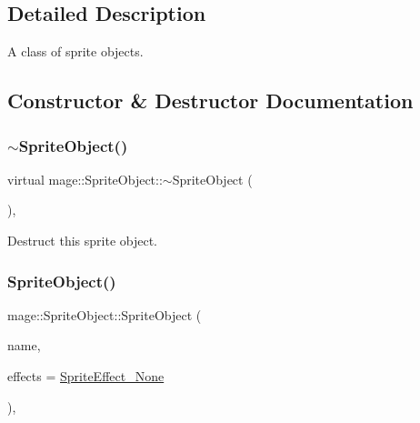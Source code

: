 \subsection{Detailed Description}
A class of sprite objects. 

\subsection{Constructor \& Destructor Documentation}
\hypertarget{classmage_1_1_sprite_object_a88c02e6af2ab79389de368dd9ba32930}{}\label{classmage_1_1_sprite_object_a88c02e6af2ab79389de368dd9ba32930} 
\subsubsection{\texorpdfstring{$\sim$\+Sprite\+Object()}{~SpriteObject()}}
{\footnotesize\ttfamily virtual mage\+::\+Sprite\+Object\+::$\sim$\+Sprite\+Object (\begin{DoxyParamCaption}{ }\end{DoxyParamCaption})\hspace{0.3cm}{\ttfamily [virtual]}, {\ttfamily [default]}}

Destruct this sprite object. \hypertarget{classmage_1_1_sprite_object_a1d487cfddfd6e3f60047f9316522ba8b}{}\label{classmage_1_1_sprite_object_a1d487cfddfd6e3f60047f9316522ba8b} 
\subsubsection{\texorpdfstring{Sprite\+Object()}{SpriteObject()}\hspace{0.1cm}{\footnotesize\ttfamily [1/3]}}
{\footnotesize\ttfamily mage\+::\+Sprite\+Object\+::\+Sprite\+Object (\begin{DoxyParamCaption}\item[{const string \&}]{name,  }\item[{\hyperlink{namespacemage_a9cfe18123066ba4236f548f9de75d881}{Sprite\+Effect}}]{effects = {\ttfamily \hyperlink{namespacemage_a9cfe18123066ba4236f548f9de75d881af3c275fbfacfe174da928b2f24dfa515}{Sprite\+Effect\+\_\+\+None}} }\end{DoxyParamCaption})\hspace{0.3cm}{\ttfamily [explicit]}, {\ttfamily [protected]}}

